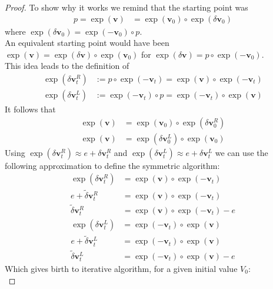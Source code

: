 \begin{proof}
	To show why it works we remind that the starting point was
	\begin{align*}
	p= \exp(\mathbf{v}) &=  \exp(\mathbf{v}_{0})\circ \exp(\delta \mathbf{v}_{0})
	\end{align*}
	where $\exp(\delta \mathbf{v}_{0}) = \exp(-\mathbf{v}_{0})\circ p$.\\
	An equivalent starting point would have been $\exp(\mathbf{v}) = \exp(\delta \mathbf{v})\circ \exp(\mathbf{v}_{0})$ for $\exp(\delta \mathbf{v}) = p\circ \exp(-\mathbf{v}_{0})$. \\
	This idea leads to the definition of
	\begin{align*}
	\exp(\delta \mathbf{v}^{R}_{t}) &:= p\circ \exp(- \mathbf{v}_{t}) = \exp(\mathbf{v})\circ \exp(- \mathbf{v}_{t})\\
	\exp(\delta \mathbf{v}^{L}_{t}) &:=  \exp(- \mathbf{v}_{t}) \circ p = \exp(- \mathbf{v}_{t}) \circ \exp(\mathbf{v}) 
	\end{align*}
	It follows that 
	\begin{align*}
	\exp(\mathbf{v}) &= \exp(\mathbf{v}_{0})\circ \exp(\delta \mathbf{v}^{R}_{0})\\
	\exp(\mathbf{v}) &=  \exp(\delta \mathbf{v}^{L}_{0}) \circ \exp(\mathbf{v}_{0})
	\end{align*}
	Using $\exp(\delta \mathbf{v}^{R}_{t}) \approx e + \delta \mathbf{v}^{R}_{t}$ and $\exp(\delta \mathbf{v}^{L}_{t}) \approx e + \delta \mathbf{v}^{L}_{t}$ we can use the following approximation to define the symmetric algorithm:
	\begin{align*}
	\exp(\delta \mathbf{v}^{R}_{t}) &= \exp(\mathbf{v})\circ \exp(-\mathbf{v}_{t})\\
	e + \tilde{\delta} \mathbf{v}^{R}_{t} &= \exp(\mathbf{v})\circ \exp(- \mathbf{v}_{t})\\
	\tilde{\delta} \mathbf{v}^{R}_{t} &= \exp(\mathbf{v})\circ \exp(- \mathbf{v}_{t}) - e
	\end{align*}
	\begin{align*}
	\exp(\delta \mathbf{v}^{L}_{t}) &= \exp(- \mathbf{v}_{t}) \circ \exp(\mathbf{v})\\
	e + \tilde{\delta} \mathbf{v}^{L}_{t} &= \exp(-\mathbf{v}_{t})\circ \exp( \mathbf{v})\\
	\tilde{\delta} \mathbf{v}^{L}_{t} &= \exp(-\mathbf{v}_{t})\circ \exp(\mathbf{v}) - e
	\end{align*}
	Which gives birth to iterative algorithm, for a given initial value $V_0$:  
	\begin{equation}

\end{equation}
\end{proof}
